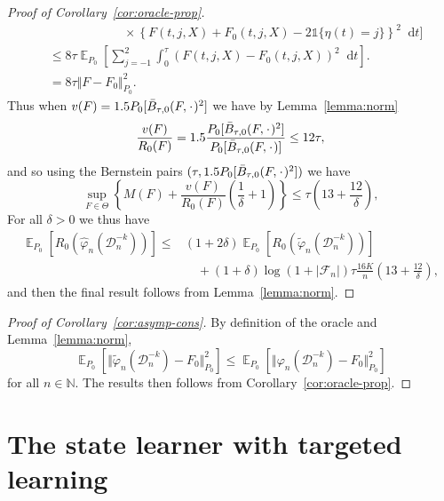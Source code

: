 \documentclass[unnumsec,webpdf,contemporary,large,namedate]{oup-authoring-template}%
\theoremstyle{thmstyleone}%
\theoremstyle{thmstyletwo}%
\theoremstyle{thmstylethree}%
\DeclareMathOperator{\E}{\mathbb{E}} %
\newcommand{\N}{\mathbb{N}}
\newcommand{\blank}{\makebox[1ex]{\textbf{$\cdot$}}}
\renewcommand{\phi}{\varphi}
\newcommand*\diff{\mathop{}\!\mathrm{d}}
\newcommand{\1}{\mathds{1}}
\newcommand{\data}{\ensuremath{\mathcal{D}}}
\begin{document}
\begin{appendices}
\begin{proof}[Proof of Corollary~\ref{cor:oracle-prop}]
\begin{align*}
  & \quad \quad \quad\quad \quad \quad \times
    \left\{
    F(t, j, X) +  F_0(t, j, X)-2 \1{\{\eta(t) = j\}}
    \right\}^2
    \diff t 
    \Bigg]
  \\
  & \leq
    8\tau \E_{P_0}{\left[
    \sum_{j=-1}^{2} \int_0^{\tau}
    \left(
    F(t, j, X) - F_0(t, j, X)
    \right)^2
    \diff t 
    \right]}.
  \\
  & =
    8\tau \Vert F - F_0 \Vert_{P_0}^2.
\end{align*}
Thus when \( v(F) = 1.5 P_0{[\bar{B}_{\tau,0}(F, \blank)^2]} \) we have by
Lemma~\ref{lemma:norm}
\begin{equation*}
  \frac{v(F)}{R_0(F)}
  = 1.5 \frac{P_0{[\bar{B}_{\tau,0}(F, \blank)^2]}}{P_0{[\bar{B}_{\tau,0}(F, \blank)]}}
  \leq 12 \tau,
\end{equation*}
and so using the Bernstein pairs \( (\tau, 1.5 P_0{[\bar{B}_{\tau,0}(F, \blank)^2]}) \) we have
\begin{equation*}
  \sup_{F \in \Theta}
  \left\{
    M(F) + \frac{v(F)}{R_0(F)}
    \left(
      \frac{1}{\delta} + 1
    \right)
  \right\}
  \leq \tau
  \left(
    13 + \frac{12}{\delta}
  \right),
\end{equation*}
For all $\delta>0$ we thus have
\begin{align*}
  \E_{P_0}{\left[ R_0(\hat{\phi}_n(\data_n^{-k})) \right]}
  \leq
  &(1+2\delta)\E_{P_0}{\left[ R_0(\tilde{\phi}_n(\data_n^{-k})) \right]}
  \\
  & \quad
    + (1+\delta)\log(1 + |\mathcal{F}_n|) \tau \frac{16 K}{n}
    \left(
    13 + \frac{12}{\delta}
    \right),
\end{align*}
and then the final result follows from Lemma~\ref{lemma:norm}.
\end{proof}

\begin{proof}[Proof of Corollary~\ref{cor:asymp-cons}]
  By definition of the oracle and Lemma~\ref{lemma:norm},
  \begin{equation*}
    \E_{P_0}{\left[ \Vert \tilde{\phi}_n(\data_n^{-k}) - F_0 \Vert_{P_0}^2
      \right]} \leq \E_{P_0}{\left[ \Vert \phi_n(\data_n^{-k}) - F_0 \Vert_{P_0}^2
      \right]}  
  \end{equation*}
  for all \( n \in \N \). The results then follows from
  Corollary~\ref{cor:oracle-prop}.
\end{proof}


\section{The state learner with targeted learning}
\label{sec:state-learner-with}


\end{appendices}
\end{document}
